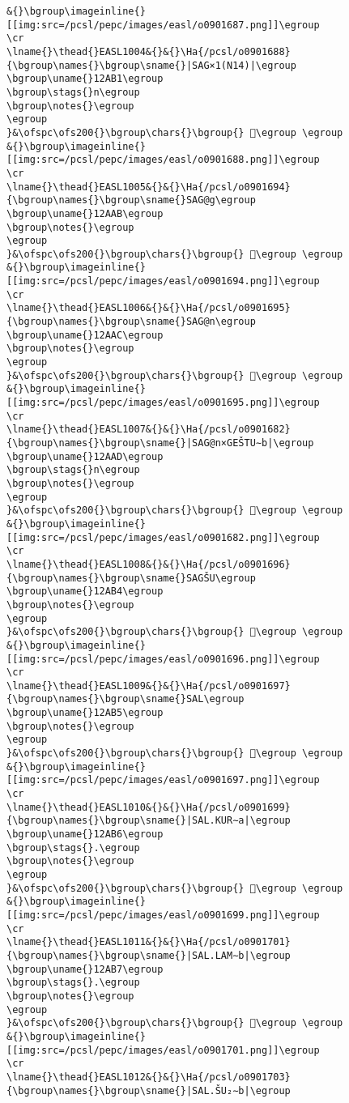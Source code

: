 \begin{verbatim}
&{}\bgroup\imageinline{}[[img:src=/pcsl/pepc/images/easl/o0901687.png]]\egroup
\cr
\lname{}\thead{}EASL1004&{}&{}\Ha{/pcsl/o0901688}{\bgroup\names{}\bgroup\sname{}|SAG×1(N14)|\egroup
\bgroup\uname{}12AB1\egroup
\bgroup\stags{}n\egroup
\bgroup\notes{}\egroup
\egroup
}&\ofspc\ofs200{}\bgroup\chars{}\bgroup{} 𒪱\egroup \egroup
&{}\bgroup\imageinline{}[[img:src=/pcsl/pepc/images/easl/o0901688.png]]\egroup
\cr
\lname{}\thead{}EASL1005&{}&{}\Ha{/pcsl/o0901694}{\bgroup\names{}\bgroup\sname{}SAG@g\egroup
\bgroup\uname{}12AAB\egroup
\bgroup\notes{}\egroup
\egroup
}&\ofspc\ofs200{}\bgroup\chars{}\bgroup{} 𒪫\egroup \egroup
&{}\bgroup\imageinline{}[[img:src=/pcsl/pepc/images/easl/o0901694.png]]\egroup
\cr
\lname{}\thead{}EASL1006&{}&{}\Ha{/pcsl/o0901695}{\bgroup\names{}\bgroup\sname{}SAG@n\egroup
\bgroup\uname{}12AAC\egroup
\bgroup\notes{}\egroup
\egroup
}&\ofspc\ofs200{}\bgroup\chars{}\bgroup{} 𒪬\egroup \egroup
&{}\bgroup\imageinline{}[[img:src=/pcsl/pepc/images/easl/o0901695.png]]\egroup
\cr
\lname{}\thead{}EASL1007&{}&{}\Ha{/pcsl/o0901682}{\bgroup\names{}\bgroup\sname{}|SAG@n×GEŠTU∼b|\egroup
\bgroup\uname{}12AAD\egroup
\bgroup\stags{}n\egroup
\bgroup\notes{}\egroup
\egroup
}&\ofspc\ofs200{}\bgroup\chars{}\bgroup{} 𒪭\egroup \egroup
&{}\bgroup\imageinline{}[[img:src=/pcsl/pepc/images/easl/o0901682.png]]\egroup
\cr
\lname{}\thead{}EASL1008&{}&{}\Ha{/pcsl/o0901696}{\bgroup\names{}\bgroup\sname{}SAGŠU\egroup
\bgroup\uname{}12AB4\egroup
\bgroup\notes{}\egroup
\egroup
}&\ofspc\ofs200{}\bgroup\chars{}\bgroup{} 𒪴\egroup \egroup
&{}\bgroup\imageinline{}[[img:src=/pcsl/pepc/images/easl/o0901696.png]]\egroup
\cr
\lname{}\thead{}EASL1009&{}&{}\Ha{/pcsl/o0901697}{\bgroup\names{}\bgroup\sname{}SAL\egroup
\bgroup\uname{}12AB5\egroup
\bgroup\notes{}\egroup
\egroup
}&\ofspc\ofs200{}\bgroup\chars{}\bgroup{} 𒪵\egroup \egroup
&{}\bgroup\imageinline{}[[img:src=/pcsl/pepc/images/easl/o0901697.png]]\egroup
\cr
\lname{}\thead{}EASL1010&{}&{}\Ha{/pcsl/o0901699}{\bgroup\names{}\bgroup\sname{}|SAL.KUR∼a|\egroup
\bgroup\uname{}12AB6\egroup
\bgroup\stags{}.\egroup
\bgroup\notes{}\egroup
\egroup
}&\ofspc\ofs200{}\bgroup\chars{}\bgroup{} 𒪶\egroup \egroup
&{}\bgroup\imageinline{}[[img:src=/pcsl/pepc/images/easl/o0901699.png]]\egroup
\cr
\lname{}\thead{}EASL1011&{}&{}\Ha{/pcsl/o0901701}{\bgroup\names{}\bgroup\sname{}|SAL.LAM∼b|\egroup
\bgroup\uname{}12AB7\egroup
\bgroup\stags{}.\egroup
\bgroup\notes{}\egroup
\egroup
}&\ofspc\ofs200{}\bgroup\chars{}\bgroup{} 𒪷\egroup \egroup
&{}\bgroup\imageinline{}[[img:src=/pcsl/pepc/images/easl/o0901701.png]]\egroup
\cr
\lname{}\thead{}EASL1012&{}&{}\Ha{/pcsl/o0901703}{\bgroup\names{}\bgroup\sname{}|SAL.ŠU₂∼b|\egroup

\end{verbatim}
